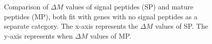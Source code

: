 \documentclass[11pt]{labbook}
\begin{document}
\begin{figure}[H]
\caption{Comparison of $\Delta\mathit{M}$ values of signal peptides (SP) and mature peptides (MP), both fit with genes with no signal peptides as a separate category. The x-axis represents the $\Delta\mathit{M}$ values of SP. The y-axis represents when $\Delta\mathit{M}$ values of MP.}
\end{figure}
\end{document}
